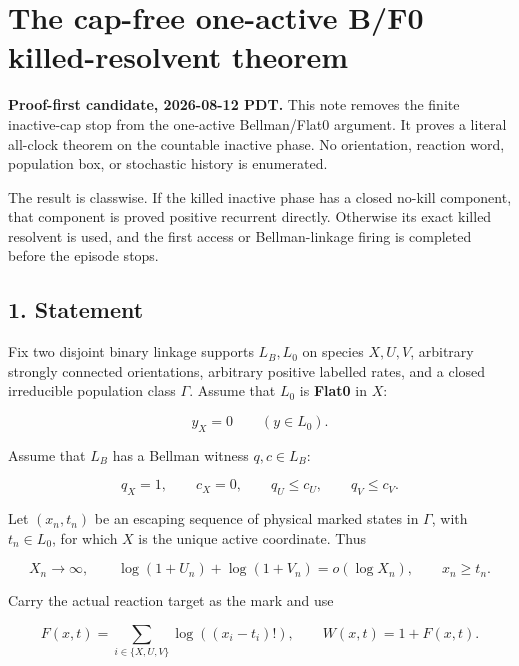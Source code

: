 \section{The cap-free one-active B/F0 killed-resolvent
theorem}

\textbf{Proof-first candidate, 2026-08-12 PDT.} This note removes the
finite inactive-cap stop from the one-active Bellman/Flat0 argument. It
proves a literal all-clock theorem on the countable inactive phase. No
orientation, reaction word, population box, or stochastic history is
enumerated.

The result is classwise. If the killed inactive phase has a closed
no-kill component, that component is proved positive recurrent directly.
Otherwise its exact killed resolvent is used, and the first access or
Bellman-linkage firing is completed before the episode stops.

\subsection{1. Statement}

Fix two disjoint binary linkage supports \(L_B,L_0\) on species
\(X,U,V\), arbitrary strongly connected orientations, arbitrary positive
labelled rates, and a closed irreducible population class \(\Gamma\).
Assume that \(L_0\) is \textbf{Flat0} in \(X\):

\[
                         y_X=0\qquad(y\in L_0).       \tag{1.1}
\]

Assume that \(L_B\) has a Bellman witness \(q,c\in L_B\):

\[
 q_X=1,\qquad c_X=0,\qquad
 q_U\le c_U,\qquad q_V\le c_V.                       \tag{1.2}
\]

Let \((x_n,t_n)\) be an escaping sequence of physical marked states in
\(\Gamma\), with \(t_n\in L_0\), for which \(X\) is the unique active
coordinate. Thus

\[
 X_n\longrightarrow\infty,\qquad
 \log(1+U_n)+\log(1+V_n)=o(\log X_n),\qquad x_n\ge t_n.
                                                               \tag{1.3}
\]

Carry the actual reaction target as the mark and use

\[
 F(x,t)=\sum_{i\in\{X,U,V\}}\log((x_i-t_i)!),
 \qquad W(x,t)=1+F(x,t).                              \tag{1.4}
\]

